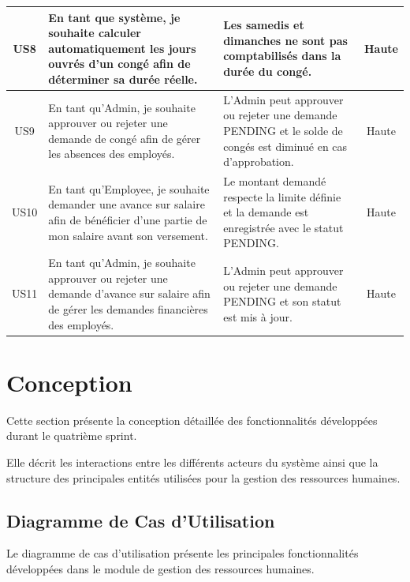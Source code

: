 \begin{longtable}{|c|>{\RaggedRight\arraybackslash}p{5cm}|>{\RaggedRight\arraybackslash}p{5cm}|c|}
US8 &
En tant que système, je souhaite calculer automatiquement les jours ouvrés d'un congé afin de déterminer sa durée réelle. &
Les samedis et dimanches ne sont pas comptabilisés dans la durée du congé. &
Haute
\\
\hline

US9 &
En tant qu'Admin, je souhaite approuver ou rejeter une demande de congé afin de gérer les absences des employés. &
L'Admin peut approuver ou rejeter une demande PENDING et le solde de congés est diminué en cas d'approbation. &
Haute
\\
\hline

US10 &
En tant qu'Employee, je souhaite demander une avance sur salaire afin de bénéficier d'une partie de mon salaire avant son versement. &
Le montant demandé respecte la limite définie et la demande est enregistrée avec le statut PENDING. &
Haute
\\
\hline

US11 &
En tant qu'Admin, je souhaite approuver ou rejeter une demande d'avance sur salaire afin de gérer les demandes financières des employés. &
L'Admin peut approuver ou rejeter une demande PENDING et son statut est mis à jour. &
Haute
\\
\hline


\end{longtable}



\section{Conception}

Cette section présente la conception détaillée des fonctionnalités développées durant le quatrième sprint.

Elle décrit les interactions entre les différents acteurs du système ainsi que la structure des principales entités utilisées pour la gestion des ressources humaines.



\subsection{Diagramme de Cas d'Utilisation}

Le diagramme de cas d'utilisation présente les principales fonctionnalités
développées dans le module de gestion des ressources humaines.

